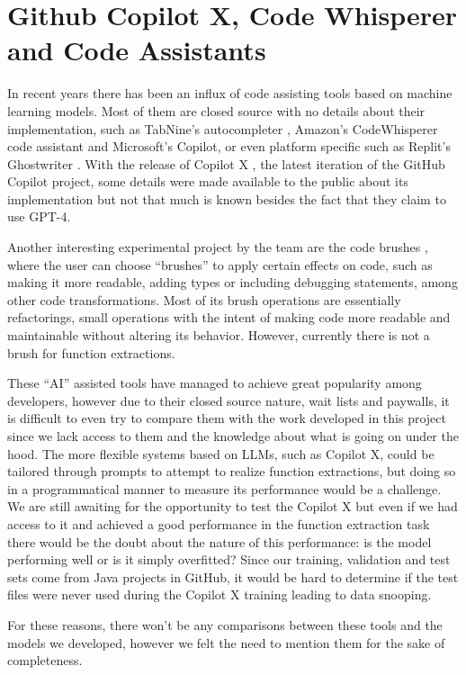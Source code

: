 \section{Github Copilot X, Code Whisperer and Code Assistants}

In recent years there has been an influx of code assisting tools based on machine learning models. Most of them are closed source with no details about their implementation, such as TabNine's autocompleter \citep{tabnine}, Amazon's CodeWhisperer code assistant \citep{whisperer} and Microsoft's Copilot, or even platform specific such as Replit's Ghostwriter \citep{ghost_writer}. With the release of Copilot X \citep{copilotx}, the latest iteration of the GitHub Copilot project, some details were made available to the public about its implementation but not that much is known besides the fact that they claim to use GPT-4.


Another interesting experimental project by the \citet{brushes} team are the code brushes , where the user can choose ``brushes'' to apply certain effects on code, such as making it more readable, adding types or including debugging statements, among other code transformations. Most of its brush operations are essentially refactorings, small operations with the intent of making code more readable and maintainable without altering its behavior. 
However, currently there is not a brush for function extractions.


These ``AI'' assisted tools have managed to achieve great popularity among developers, however due to their closed source nature, wait lists and paywalls, it is difficult to even try to compare them with the work developed in this project since we lack access to them and the knowledge about what is going on under the hood. The more flexible systems based on LLMs, such as Copilot X, could be tailored through prompts to attempt to realize function extractions, but doing so in a programmatical manner to measure its performance would be a challenge. We are still awaiting for the opportunity to test the Copilot X but even if we had access to it and achieved a good performance in the function extraction task there would be the doubt about the nature of this performance: is the model performing well or is it simply overfitted? Since our training, validation and test sets come from Java projects in GitHub, it would be hard to determine if the test files were never used during the Copilot X training leading to data snooping.

For these reasons, there won't be any comparisons between these tools and the models we developed, however we felt the need to mention them for the sake of completeness.





